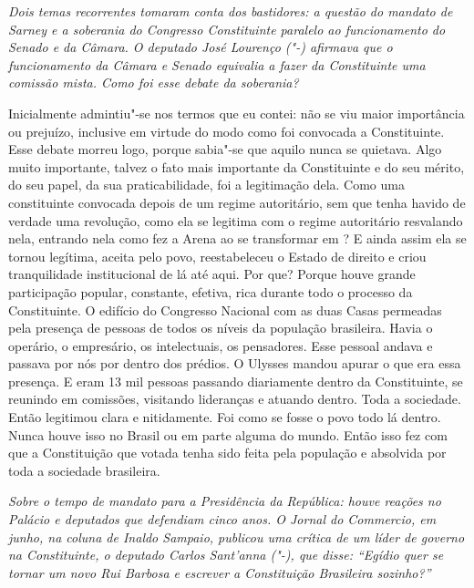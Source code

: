 \medskip

\noindent\emph{Dois temas recorrentes tomaram conta dos bastidores: a questão
do mandato de Sarney e a soberania do Congresso Constituinte paralelo ao
funcionamento do Senado e da Câmara. O deputado José Lourenço ("-)
afirmava que o funcionamento da Câmara e Senado equivalia a fazer da
Constituinte uma comissão mista. Como foi esse debate da soberania?}

Inicialmente admintiu"-se nos termos que eu contei: não
se viu maior importância ou prejuízo, inclusive em virtude do modo como
foi convocada a Constituinte. Esse debate morreu logo, porque sabia"-se
que aquilo nunca se quietava. Algo muito importante, talvez o fato mais
importante da Constituinte e do seu mérito, do seu papel, da sua
praticabilidade, foi a legitimação dela. Como uma constituinte convocada
depois de um regime autoritário, sem que tenha havido de verdade uma
revolução, como ela se legitima com o regime autoritário resvalando
nela, entrando nela como fez a Arena ao se transformar em ? E ainda
assim ela se tornou legítima, aceita pelo povo, reestabeleceu o Estado
de direito e criou tranquilidade institucional de lá até aqui. Por que?
Porque houve grande participação popular, constante, efetiva, rica
durante todo o processo da Constituinte. O edifício do Congresso
Nacional com as duas Casas permeadas pela presença de pessoas de todos
os níveis da população brasileira. Havia o operário, o empresário, os
intelectuais, os pensadores. Esse pessoal andava e passava por nós por
dentro dos prédios. O Ulysses mandou apurar o que era essa presença. E
eram 13 mil pessoas passando diariamente dentro da Constituinte, se
reunindo em comissões, visitando lideranças e atuando dentro. Toda a
sociedade. Então legitimou clara e nitidamente. Foi como se fosse o povo
todo lá dentro. Nunca houve isso no Brasil ou em parte alguma do mundo.
Então isso fez com que a Constituição que votada tenha sido feita pela
população e absolvida por toda a sociedade brasileira.

\medskip

\noindent\emph{Sobre o tempo de mandato para a Presidência da República: houve
reações no Palácio e deputados que defendiam cinco anos. O \emph{Jornal do
Commercio}, em junho, na coluna de Inaldo Sampaio, publicou uma crítica
de um líder de governo na Constituinte, o deputado Carlos Sant'anna
("-), que disse: ``Egídio quer se tornar um novo Rui Barbosa e
escrever a Constituição Brasileira sozinho?''}

